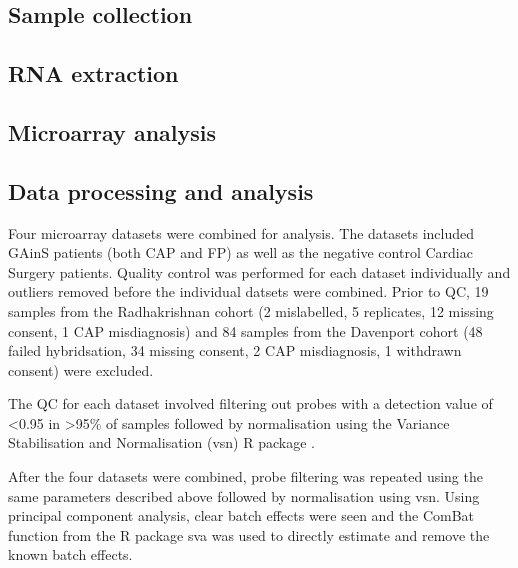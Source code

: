 \subsection{Sample collection}
\subsection{RNA extraction}


\subsection{Microarray analysis}

\subsection{Data processing and analysis}
Four microarray datasets were combined for analysis. The datasets included GAinS patients (both CAP and FP) as well as the negative control Cardiac Surgery patients. Quality control was performed for each dataset individually and outliers removed before the individual datsets were combined. Prior to QC, 19 samples from the Radhakrishnan cohort (2 mislabelled, 5 replicates, 12 missing consent, 1 CAP misdiagnosis) and 84 samples from the Davenport cohort (48 failed hybridsation, 34 missing consent, 2 CAP misdiagnosis, 1 withdrawn consent) were excluded.

The QC for each dataset involved filtering out probes with a detection value of <0.95  in >95\% of samples followed by normalisation using the Variance Stabilisation and Normalisation (vsn) R package \cite{Huber2002}. 

After the four datasets were combined, probe filtering was repeated using the same parameters described above followed by normalisation using vsn. Using principal component analysis, clear batch effects were seen and the ComBat function from the R package sva was used to directly estimate and remove the known batch effects. 



